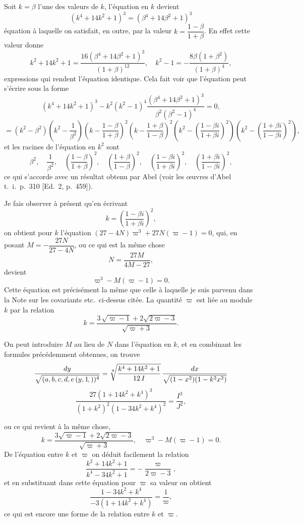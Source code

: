 \documentclass[11pt,a4paper]{article}
\newcommand{\fcn}[2]{(#1\kern-1pt, #2)}
\begin{document}
Soit $k = \beta$ l'une des valeurs de $k$, l'\'equation en $k$ devient
\[
(k^4 + 14 k^2 + 1)^3 = (\beta^4 + 14 \beta^2 + 1)^3
\]
\setcounter{page}{63}
\'equation \`a laquelle on satisfait, en outre, par la valeur $k = \dfrac{1-\beta}{1+\beta}$.
En effet cette valeur donne
\[
k^2 + 14 k^2 + 1 = \frac{16(\beta^4 + 14\beta^2 + 1)^3}{(1 + \beta)^{12}}, \quad k^2 - 1 = -\frac{8 \beta (1+\beta^2)}{(1+\beta)^4},
\]
expressions qui rendent l'\'equation identique. Cela fait voir que l'\'equation
peut s'\'ecrire sous la forme
\[
(k^4 + 14 k^2 + 1)^3 - k^2 (k^2 - 1)^4 \frac{(\beta^4 + 14 \beta^2 + 1)^3}{\beta^2 (\beta^2 - 1)^4} = 0,
\]
\[
= (k^2 - \beta^2) \left(k^2 - \frac{1}{\beta^2}\right) \left(k - \frac{1-\beta}{1+\beta}\right)^{\!2} \left(k - \frac{1+\beta}{1-\beta}\right)^{\!2} \left(k^2 - \left(\frac{1-\beta i}{1+\beta i}\right)^{\!2}\right) \left(k^2 - \left(\frac{1+\beta i}{1-\beta i}\right)^{\!2}\right),
\]
et les racines de l'\'equation en $k^2$ sont
\[
\beta^2,\quad \frac{1}{\beta^2},\quad \left(\frac{1-\beta}{1+\beta}\right)^{\!2},\quad \left(\frac{1+\beta}{1-\beta}\right)^{\!2},\quad \left(\frac{1-\beta i}{1+\beta i}\right)^{\!2},\quad \left(\frac{1+\beta i}{1-\beta i}\right)^{\!2},
\]
ce qui s'accorde avec un r\'esultat obtenu par Abel (voir les \oe uvres d'Abel
t.~i.~p.~310 [Ed.~2, p.~459]).

Je fais observer \`a pr\'esent qu'en \'ecrivant
\[
k = \left(\frac{1-\beta i}{1+\beta i}\right)^{\!2},
\]
on obtient pour $k$ l'\'equation $(27 - 4 N)\varpi^3 + 27 N (\varpi - 1) = 0$, qui,
en posant $M = -\dfrac{27 N}{27 - 4 N}$, ou ce qui est la m\^eme chose
\[
N = \dfrac{27 M}{4 M - 27},
\]
devient
\[
\varpi^3 - M (\varpi - 1) = 0.
\]
Cette \'equation est pr\'ecis\'ement la m\^eme que celle \`a laquelle je suis
parvenu dans la Note sur les covariants etc.\ ci-dessus cit\'ee. La quantit\'e
$\varpi$ est li\'ee au module $k$ par la relation
\[
k = \frac{3\,\sqrt{\varpi - 1} + 2\sqrt{2\varpi - 3}}{\sqrt{\varpi + 3}}.
\]

On peut introduire $M$ au lieu de $N$ dans l'\'equation en $k$, et en combinant les
formules pr\'ec\'edemment obtenues, on trouve
\[
\frac{dy}{\sqrt{(a,b,c,d,e\,\fcn{y,1})^4}} = \sqrt[4]{\frac{k^4 + 14 k^2 + 1}{12\,I}}\,\frac{dx}{\sqrt{(1-x^2)(1-k^2 x^2)}}
\]
\[
\frac{27(1 + 14 k^2 + k^4)^3}{(1 + k^2)^2 (1 - 34 k^2 + k^4)^2} = \frac{I^3}{J^2},
\]

\setcounter{page}{64}

ou ce qui revient \`a la m\^eme chose,
\[
k = \frac{3\sqrt{\varpi - 1} + 2\sqrt{2\varpi - 3}}{\sqrt{\varpi + 3}}, \quad \varpi^3 - M(\varpi - 1) = 0.
\]
De l'\'equation entre $k$ et $\varpi$ on d\'eduit facilement la relation
\[
\frac{k^2 + 14 k^2 + 1}{k^4 - 34 k^2 + 1} = -\frac{\varpi}{2\varpi - 3},
\]
et en substituant dans cette \'equation pour $\varpi$ sa valeur on obtient
\[
\frac{1 - 34 k^2 + k^4}{-3(1 + 14 k^2 + k^4)} = \frac{1}{\varpi},
\]
ce qui est encore une forme de la relation entre $k$ et $\varpi$.
\end{document}
